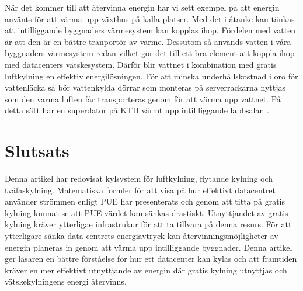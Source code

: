 \documentclass[conference,a4paper]{IEEEtran}
\begin{document}
När det kommer till att återvinna energin har vi sett exempel på att energin använts för att värma upp växthus på kalla platser. Med det i åtanke kan tänkas att 
intilliggande byggnaders \cite{reuse1} värmesystem kan kopplas ihop. Fördelen med vatten är att den är en bättre tranportör av värme. 
Dessutom så används vatten i våra byggnaders värmesystem redan vilket gör det till ett bra element att koppla ihop med datacenters vätskesystem. Därför blir vattnet i kombination 
med gratis luftkylning en effektiv energilösningen. För att minska underhållskostnad i oro för vattenläcka så bör vattenkylda dörrar som monteras på serverrackarna 
nyttjas som den varma luften får transporteras genom för att värma upp vattnet. På detta sätt har en superdator på KTH värmt upp intillliggande labbsalar~\cite{reuse1}.  
\section{Slutsats}
Denna artikel har redovisat kylsystem för luftkylning, flytande kylning och tvåfaskylning. Matematiska formler för att visa på hur effektivt datacentret använder strömmen enligt 
PUE har presenterats och genom att titta på gratis kylning kunnat se att PUE-värdet kan sänkas drastiskt. Utnyttjandet av gratis kylning kräver ytterligae infrastrukur för att ta 
tillvara på denna resurs. För att ytterligare sänka data centrets energiavtryck kan återvinningsmöjligheter av energin planeras in genom att värma upp intilliggande byggnader. 
Denna artikel ger läsaren en bättre förståelse för hur ett datacenter kan kylas och att framtiden kräver en mer effektivt utnyttjande av energin där gratis kylning utnyttjas och 
vätskekylningens energi återvinns. 

\printbibliography
\end{document}
